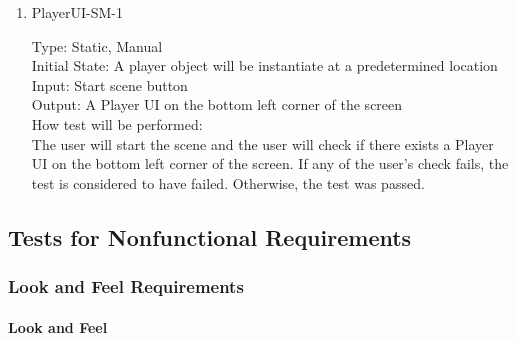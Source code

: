 \documentclass[12pt, titlepage]{article}
\newcounter{ftnum}
\begin{document}
\begin{enumerate}

\item{{\color{magenta} PlayerUI-SM-1}\\}   \label{F21-1}

{\color{magenta} Type: Static, Manual}  \\
					
{\color{magenta} Initial State: A player object will be instantiate at a predetermined location}\\
					
{\color{magenta} Input: Start scene button}\\
					
{\color{magenta} Output: A Player UI on the bottom left corner of the screen}\\
					
{\color{magenta} How test will be performed:}\\  {\color{magenta} The user will start the scene and the user will check if there exists a Player UI on the bottom left corner of the screen. If any of the user's check fails, the test is considered to have failed. Otherwise, the test was passed.}\\

\end{enumerate}

\subsection{Tests for Nonfunctional Requirements}

\subsubsection{Look and Feel Requirements}

\paragraph{Look and Feel}
\end{document}
